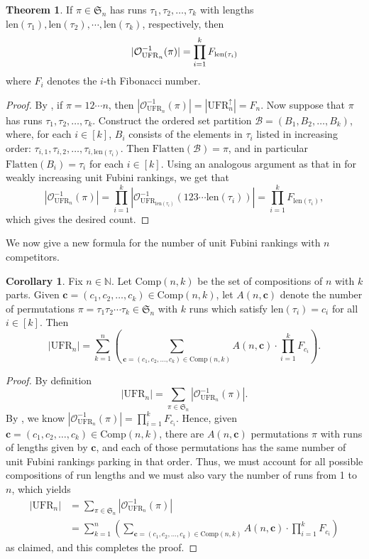 \documentclass{amsart}
\newcommand{\Flatten}[0]{\mathrm{Flatten}}
\theoremstyle{definition}
\newtheorem{theorem}{Theorem}[section]
\newtheorem{corollary}{Corollary}[section]
\theoremstyle{definition}
\theoremstyle{remark}
\newcommand{\NN}{\mathbb{N}}
\newcommand{\UFR}[1]{\mathrm{UFR}_{#1}}
\newcommand{\out}{\mathcal{O}}
\newcommand{\len}{\mathrm{len}}
\newcommand{\Comp}{\mathrm{Comp}}
\newcommand{\Sym}{\mathfrak{S}}
\begin{document}
\begin{theorem}\label{thm:number of UFR with outcome pi}
        If $\pi\in\mathfrak{S}_n$ has runs  $\tau_1,\tau_2,\ldots,\tau_k$ with lengths $\len(\tau_1), \len(\tau_2), \cdots, \len(\tau_{k})$, respectively, 
        then 
    \begin{equation}
        |\out^{-1}_{\UFR{n}}(\pi)| 
        = \prod_{i=1}^kF_{\len(\tau_i)}\qedhere
    \end{equation}
    where $F_i$ denotes the $i$-th Fibonacci number.
\end{theorem}
\begin{proof}
      By , if $\pi = 1 2 \cdots n$, then $|\out^{-1}_{\UFR{n}}(\pi)| = |\UFR{n}^{\uparrow}| = F_n$.
      Now suppose that $\pi$ has runs $\tau_1,\tau_2,\ldots,\tau_k$. Construct the ordered set partition $\mathcal{B} = (B_1,B_2,\ldots, B_k)$, where, for each $i\in[k]$, $B_i$ consists of the elements in $\tau_i$ listed in increasing order: $\tau_{i,1}, \tau_{i,2},\ldots, \tau_{i,\len(\tau_i)}$. Then $\Flatten(\mathcal{B})=\pi$, and in particular $\Flatten(B_i)=\tau_i$ for each $i\in [k]$.
      Using an analogous argument as that in  for weakly increasing unit Fubini rankings, we get that 
       \[|\out_{\UFR{n}}^{-1}(\pi)|=\prod_{i=1}^k |\out_{\UFR{\len(\tau_i)}}^{-1}(123\cdots \len(\tau_i))|=\prod_{i=1}^kF_{\len(\tau_i)},\]
      which gives the desired count.
     \qedhere
\end{proof}

We now give a new formula for the number of unit Fubini rankings with $n$ competitors.
\begin{corollary}\label{cor:formula for uni fubini using compositions}
Fix $n\in \NN$. 
Let $\Comp(n,k)$ be the set of compositions of $n$ with $k$ parts. Given $\textbf{c}=(c_1,c_2,\ldots,c_k)\in\Comp(n,k)$, let $A(n,\textbf{c})$ denote the number of permutations $\pi=\tau_1\tau_2\cdots\tau_k\in\Sym_n$ with $k$ runs which satisfy $\len(\tau_i)=c_i$ for all $i\in[k]$. 
Then 
    \[|\UFR{n}| =\sum_{k=1}^{n}\left(\sum_{\textbf{c}=(c_1,c_2,\ldots,c_k)\in\Comp(n,k)}A(n,\textbf{c})\cdot\prod_{i=1}^kF_{c_i}\right).\]
\end{corollary}
\begin{proof}
By definition \[|\UFR{n}|=\sum_{\pi\in\Sym_n}|\out_{\UFR{n}}^{-1}(\pi)|.\]
By , we know $|\out_{\UFR{n}}^{-1}(\pi)|=\prod_{i=1}^k F_{c_i}$. 
Hence, given $\textbf{c}=(c_1,c_2,\ldots,c_k)\in\Comp(n,k)$,  there are $A(n,\textbf{c})$ permutations $\pi$ with runs of lengths given by $\textbf{c}$, and each of those permutations has the same number of unit Fubini rankings parking in that order. 
Thus, we must account for all possible compositions of run lengths and we must also vary the number of runs from 1 to $n$, which yields
\begin{align*}
|\UFR{n}|&=\sum_{\pi\in\Sym_n}|\out_{\UFR{n}}^{-1}(\pi)|\\
&=\sum_{k=1}^{n}\left(\sum_{\textbf{c}=(c_1,c_2,\ldots,c_k)\in\Comp(n,k)}A(n,\textbf{c})\cdot\prod_{i=1}^kF_{c_i}\right)
\end{align*}
as claimed, and this completes the proof.
\end{proof}
\end{document}

